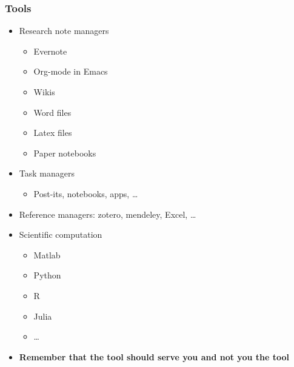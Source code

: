\documentclass[screen, aspectratio=43]{beamer}
\begin{document}
\begin{frame}
  \frametitle{Tools}
  \begin{itemize}
  \item Research note managers
    \begin{itemize}
    \item Evernote
    \item Org-mode in Emacs
    \item Wikis
    \item Word files
    \item Latex files
    \item Paper notebooks
    \end{itemize}
  \item Task managers
    \begin{itemize}
    \item Post-its, notebooks, apps, \ldots
    \end{itemize}
  \item Reference managers: zotero, mendeley, Excel, \ldots
  \item Scientific computation
    \begin{itemize}
    \item Matlab
    \item Python
    \item R
    \item Julia
    \item \ldots
    \end{itemize}
  \item \textbf{Remember that the tool should serve you and not you the tool}
  \end{itemize}
\end{frame}
\end{document}

